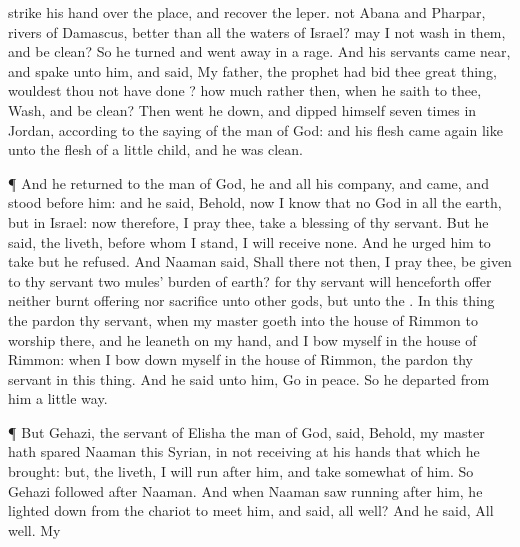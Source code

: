 {strike his
hand over the
place, and
recover the
leper.
 not
Abana and
Pharpar,
rivers of
Damascus,
better than all the
waters of
Israel? may I not
wash in them, and be
clean? So he
turned and went
away in a
rage.
And his
servants came
near, and
spake unto him, and
said, My
father,
{} the
prophet had
bid thee
{}
great
thing, wouldest thou not have
done
{}? how much rather
then, when he
saith to thee,
Wash, and be
clean?
Then went he
down, and
dipped himself
seven
times in
Jordan, according to the
saying of the
man of
God: and his
flesh came
again like unto the
flesh of a
little
child, and he was
clean.
\par }{\PP {}¶ And he
returned to the
man of
God, he and all his
company, and
came, and
stood
before him: and he
said, Behold, now I
know that
{} no
God in all the
earth, but in
Israel: now therefore, I pray thee,
take a
blessing of thy
servant.
But he
said,
{} the
{}
liveth,
before whom I
stand, I will
receive none. And he
urged him to
take
{} but he
refused.
And
Naaman
said, Shall there not then, I pray thee, be
given to thy
servant
two
mules’
burden of
earth? for thy
servant will henceforth
offer neither burnt
offering nor
sacrifice unto
other
gods, but unto the
{}.
In this
thing the
{}
pardon thy
servant,
{} when my
master
goeth into the
house of
Rimmon to
worship there, and he
leaneth on my
hand, and I
bow myself in the
house of
Rimmon: when I bow
down myself in the
house of
Rimmon, the
{}
pardon thy
servant in this
thing.
And he
said unto him,
Go in
peace. So he
departed from him a
little
way.
\par }{\PP {}¶ But
Gehazi, the
servant of
Elisha the
man of
God,
said, Behold, my
master hath
spared
Naaman this
Syrian, in not
receiving at his
hands that which he
brought: but,
{} the
{}
liveth, I will
run
after him, and
take
somewhat of him.
So
Gehazi
followed
after
Naaman. And when
Naaman
saw
{}
running
after him, he lighted
down from the
chariot to
meet him, and
said,
{} all
well?
And he
said, All
{}
well. My
}
